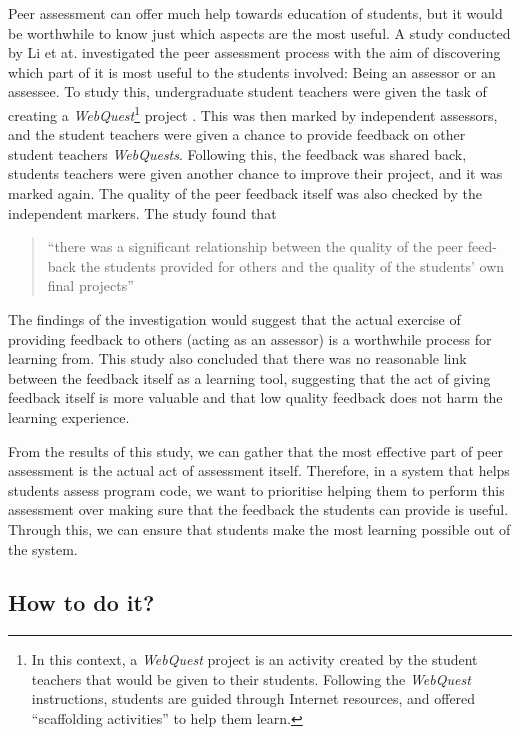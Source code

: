\documentclass[a4paper,11pt]{report}
\begin{document}
Peer assessment can offer much help towards education of students, but it would be worthwhile to know just which aspects are the most useful. A study conducted by Li et at. \cite{li_assessor_2010} investigated the peer assessment process with the aim of discovering which part of it is most useful to the students involved: Being an assessor or an assessee. To study this, undergraduate student teachers were given the task of creating a \textit{WebQuest}\footnote{In this context, a \textit{WebQuest} project is an activity created by the student teachers that would be given to their students. Following the \textit{WebQuest} instructions, students are guided through Internet resources, and offered ``scaffolding activities'' to help them learn.} project . This was then marked by independent assessors, and the student teachers were given a chance to provide feedback on other student teachers \textit{WebQuests}. Following this, the feedback was shared back, students teachers were given another chance to improve their project, and it was marked again. The quality of the peer feedback itself was also checked by the independent markers. The study found that 
\begin{quote}
``there was a significant relationship between the quality of the peer feed-back the students provided for others and the quality of the students' own final projects''
\end{quote}
The findings of the investigation would suggest that the actual exercise of providing feedback to others (acting as an assessor) is a worthwhile process for learning from. This study also concluded that there was no reasonable link between the feedback itself as a learning tool, suggesting that the act of giving feedback itself is more valuable and that low quality feedback does not harm the learning experience.\par
From the results of this study, we can gather that the most effective part of peer assessment is the actual act of assessment itself. Therefore, in a system that helps students assess program code, we want to prioritise helping them to perform this assessment over making sure that the feedback the students can provide is useful. Through this, we can ensure that students make the most learning possible out of the system.


\subsection{How to do it?}
\end{document}
